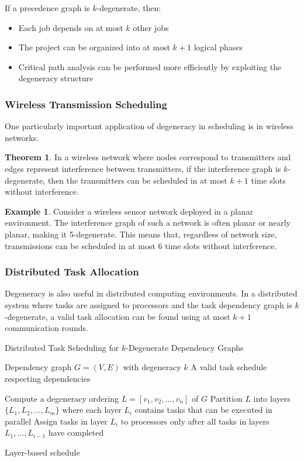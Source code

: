 \documentclass{article}
\theoremstyle{definition}
\newtheorem{example}{Example}
\newtheorem{theorem}{Theorem}
\begin{document}
If a precedence graph is $k$-degenerate, then:
\begin{itemize}
    \item Each job depends on at most $k$ other jobs
    \item The project can be organized into at most $k+1$ logical phases
    \item Critical path analysis can be performed more efficiently by exploiting the degeneracy structure
\end{itemize}
\subsubsection*{Wireless Transmission Scheduling}
One particularly important application of degeneracy in scheduling is in wireless networks.

\begin{theorem}
In a wireless network where nodes correspond to transmitters and edges represent interference between transmitters, if the interference graph is $k$-degenerate, then the transmitters can be scheduled in at most $k+1$ time slots without interference.
\end{theorem}

\begin{example}

Consider a wireless sensor network deployed in a planar environment. The interference graph of such a network is often planar or nearly planar, making it 5-degenerate. This means that, regardless of network size, transmissions can be scheduled in at most 6 time slots without interference.
\end{example}

\subsubsection*{Distributed Task Allocation}

Degeneracy is also useful in distributed computing environments. In a distributed system where tasks are assigned to processors and the task dependency graph is $k$-degenerate, a valid task allocation can be found using at most $k+1$ communication rounds.

\begin{algorithm}
\caption{Distributed Task Scheduling for $k$-Degenerate Dependency Graphs}
\label{alg:distributed-scheduling}
\begin{algorithmic}[1]
    \Require Dependency graph $G = (V, E)$ with degeneracy $k$
    \Ensure A valid task schedule respecting dependencies
    
    \State Compute a degeneracy ordering $L = [v_1, v_2, \ldots, v_n]$ of $G$
    \State Partition $L$ into layers $\{L_1, L_2, \ldots, L_m\}$ where each layer $L_i$ contains tasks that can be executed in parallel
    \State Assign tasks in layer $L_i$ to processors only after all tasks in layers $L_1, \ldots, L_{i-1}$ have completed
    
    \State \Return Layer-based schedule
\end{algorithmic}
\end{algorithm}
\end{document}

